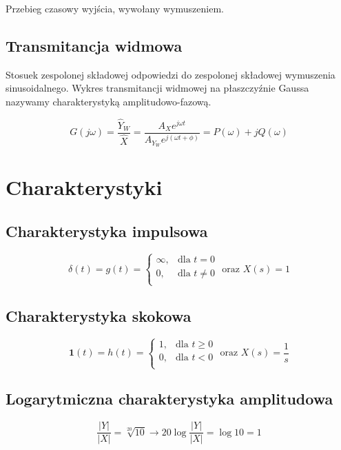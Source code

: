 \documentclass[11pt]{article}
\begin{document}
Przebieg czasowy wyjścia, wywołany wymuszeniem.

\subsection{Transmitancja widmowa}

Stosuek zespolonej składowej odpowiedzi do zespolonej składowej wymuszenia sinusoidalnego. Wykres transmitancji widmowej na płaszczyźnie Gaussa nazywamy charakterystyką amplitudowo-fazową.

$$
G(j\omega) = \frac{\hat Y_W}{\hat X} =
\frac{A_X e^{j \omega t}}{A_{Y_W} e^{j(\omega t + \phi)}} =
P(\omega) + jQ(\omega)
$$


\section{Charakterystyki}

\subsection{Charakterystyka impulsowa}

\[
	\delta(t) = g(t) = \begin{cases}
		\infty, & \text{dla } t = 0 \\
		0, & \text{dla } t \neq 0 \\
	\end{cases}
	\text{ oraz }
	X(s) = 1
\]

\subsection{Charakterystyka skokowa}

\[
	\textbf{1}(t) = h(t) = \begin{cases}
		1, & \text{dla } t \geq 0 \\
		0, & \text{dla } t < 0 \\
	\end{cases}
	\text{ oraz }
	X(s) = \frac{1}{s}
\]

\subsection{Logarytmiczna charakterystyka amplitudowa}

\[
	\frac{|Y|}{|X|} = \sqrt[20]{10}
	\rightarrow
	20 \log \frac{|Y|}{|X|} = \log 10 = 1
\]
\end{document}
